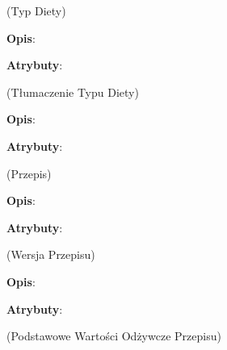 \begin{enumerate}[label={\textbf{KAT/\protect\threedigits{\theenumi}}}, wide, labelwidth=!, labelindent=0pt, labelsep=0pt, series=reqs]
     \label{kat:DietType} (Typ Diety)

    \textbf{Opis}: \lipsum[1]
    \par
    \textbf{Atrybuty}:
    \begin{itemize}[series=atr, wide, align=left, leftmargin=5cm]
         \label{kat:DietType:id}
         \label{kat:DietType:name}
    \end{itemize}

     \label{kat:DietTypeTranslation} (Tłumaczenie Typu Diety)

    \textbf{Opis}: \lipsum[1]
    \par
    \textbf{Atrybuty}:
    \begin{itemize}[series=atr, wide, align=left, leftmargin=5cm]
         \label{kat:DietTypeTranslation:id}
         \label{kat:DietTypeTranslation:translation}
         \label{kat:DietTypeTranslation:language}
    \end{itemize}

     \label{kat:Recipe} (Przepis)

    \textbf{Opis}: \lipsum[1]
    \par
    \textbf{Atrybuty}:
    \begin{itemize}[series=atr, wide, align=left, leftmargin=5cm]
         \label{kat:Recipe:id}
         \label{kat:Recipe:isPublic}
         \label{kat:Recipe:language}
    \end{itemize}

     \label{kat:RecipeVersion} (Wersja Przepisu)

    \textbf{Opis}: \lipsum[1]
    \par
    \textbf{Atrybuty}:
    \begin{itemize}[series=atr, wide, align=left, leftmargin=5cm]
         \label{kat:RecipeVersion:id}
         \label{kat:RecipeVersion:editTimestamp}
         \label{kat:RecipeVersion:name}
         \label{kat:RecipeVersion:preparationTimeMinutes}
         \label{kat:RecipeVersion:numberOfPortions}
         \label{kat:RecipeVersion:image}
         \label{kat:RecipeVersion:totalGramsWeight}
    \end{itemize}

     \label{kat:RecipeBasicNutritionData} (Podstawowe Wartości Odżywcze Przepisu)


\end{enumerate}
